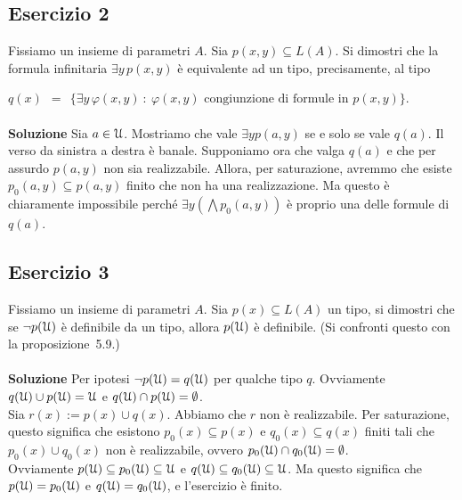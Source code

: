 \documentclass[10pt,a4paper]{article}
\def\phi{\varphi}
\def\U{\EuScript U}
\def\E{\exists}
\begin{document}
\subsection*{Esercizio 2}

Fissiamo un insieme di parametri $A$. Sia $p(x,y)\subseteq L(A)$. Si dimostri che la formula infinitaria $\E y\,p(x,y)$ \`e equivalente ad un tipo, precisamente, al tipo 

\hfill $q(x)\ \ =\ \ \big\{ \E y\,\phi(x,y)\ :\ \phi(x,y) \textrm{ congiunzione di formule in }  p(x,y)\big\}$.\\
\\
\noindent\textbf{Soluzione} Sia $a \in \U$. Mostriamo che vale $\exists y p(a,y)$ se e solo se vale $q(a)$. Il verso da sinistra a destra è banale. Supponiamo ora che valga $q(a)$ e che per assurdo $p(a,y)$ non sia realizzabile. Allora, per saturazione, avremmo che esiste $p_0(a,y) \subseteq p(a,y)$ finito che non ha una realizzazione. Ma questo è chiaramente impossibile perché $\exists y (\bigwedge p_0(a,y))$ è proprio una delle formule di $q(a)$.


\subsection*{Esercizio 3}
Fissiamo un insieme di parametri $A$. Sia $p(x)\subseteq L(A)$ un tipo, si dimostri che se $\neg p(\U)$ è definibile da un tipo, allora $p(\U)$ è definibile. (Si confronti questo con la proposizione~5.9.)\\
\\
\noindent\textbf{Soluzione} Per ipotesi $\neg p(\U)=q(\U)$ per qualche tipo $q$. Ovviamente $q(\U) \cup p(\U)= \U$ e $q(\U) \cap p(\U)= \emptyset$.\\
Sia $r(x):=p(x) \cup q(x)$. Abbiamo che $r$ non è realizzabile. Per saturazione, questo significa che esistono $p_0(x) \subseteq p(x)$ e $q_0(x) \subseteq q(x)$ finiti tali che $p_0(x) \cup q_0(x)$ non è realizzabile, ovvero $p_0(\U) \cap q_0(\U)=\emptyset$.\\
Ovviamente $p(\U) \subseteq p_0(\U) \subseteq \U$ e $q(\U) \subseteq q_0(\U) \subseteq \U$. Ma questo significa che $p(\U)=p_0(\U)$ e $q(\U)=q_0(\U)$, e l'esercizio è finito.
\end{document}
